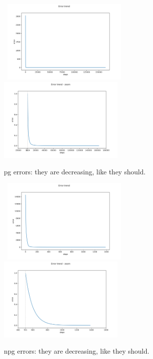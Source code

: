 \begin{figure}[htb]
    \centering
    \mbox{
        \hspace*{-19.5pt}\includegraphics[width=0.55\textwidth]{chapters/figures/errors_PG.png}
        \hspace*{-15pt}\includegraphics[width=0.55\textwidth]{chapters/figures/errors_zoom_PG.png}
    }
    \caption{\acrshort{pg} errors: they are decreasing, like they should.}
    \label{fig:errors-pg}
\end{figure}

\begin{figure}[htb]
    \centering
    \mbox{
        \hspace*{-19.5pt}\includegraphics[width=0.55\textwidth]{chapters/figures/errors_NPG.png}
        \hspace*{-15pt}\includegraphics[width=0.55\textwidth]{chapters/figures/errors_zoom_NPG.png}
    }
    \caption{\acrshort{npg} errors: they are decreasing, like they should.}
    \label{fig:errors-npg}
\end{figure}

